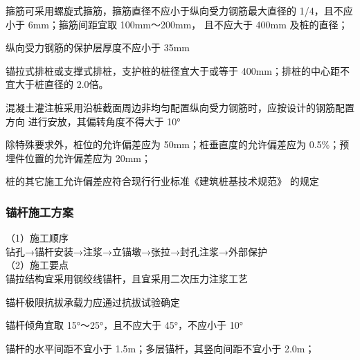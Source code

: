 箍筋可采用螺旋式箍筋，箍筋直径不应小于纵向受力钢筋最大直径的 1/4，且不应小于
6mm；箍筋间距宜取 100mm～200mm， 且不应大于 400mm 及桩的直径；

 纵向受力钢筋的保护层厚度不应小于 35mm

 锚拉式排桩或支撑式排桩，支护桩的桩径宜大于或等于 400mm；排桩的中心距不宜大于桩直径的 2.0倍。

 混凝土灌注桩采用沿桩截面周边非均匀配置纵向受力钢筋时，应按设计的钢筋配置方向
进行安放，其偏转角度不得大于 10°

 除特殊要求外，桩位的允许偏差应为 50mm；桩垂直度的允许偏差应为 0.5\%；预埋件位置的允许偏差应为 20mm；

 桩的其它施工允许偏差应符合现行行业标准《建筑桩基技术规范》 的规定

\begin{table}
    \centering
    \caption{土层系数表}
    \label{tab:c6t1}
    \end{table}   


\subsubsection{锚杆施工方案}

（1）施工顺序\\

钻孔→锚杆安装→注浆→立锚墩→张拉→封孔注浆→外部保护\\

（2）施工要点\\

 锚拉结构宜采用钢绞线锚杆，且宜采用二次压力注浆工艺

 锚杆极限抗拔承载力应通过抗拔试验确定

 锚杆倾角宜取 15°～25°，且不应大于 45°，不应小于 10°

 锚杆的水平间距不宜小于 1.5m；多层锚杆，其竖向间距不宜小于 2.0m；

